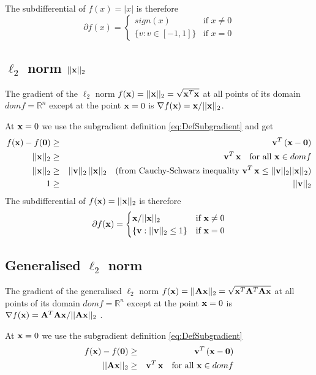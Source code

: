 The subdifferential of $f(x) = |x|$ is therefore
\begin{equation}
\partial f(x) =   
\begin{cases} 
   sign(x) & \text{if } x \neq 0 \\
   \{v: v \in [-1,1]\} & \text{if } x = 0
  \end{cases}
\end{equation}

\subsection{$\ell_2$ norm $||\mathbf{x}||_2$}
The gradient of the $\ell_2$ norm $f(\mathbf{x}) = ||\mathbf{x}||_2 = \sqrt{\mathbf{x}^T \mathbf{x}}$ at all points of its domain $dom f = \mathbb{R}^n$ except at the point $\mathbf{x}=0$ is $\nabla f(\mathbf{x}) = \mathbf{x}/||\mathbf{x}||_2$.

At $\mathbf{x}=0$ we use the subgradient definition \eqref{eq:DefSubgradient} and get
\begin{eqnarray}\label{eq:SG_L2}
f(\mathbf{x}) - f(\mathbf{0}) & \geq & \mathbf{v}^T \, (\mathbf{x} - \mathbf{0}) \nonumber \\ 
||\mathbf{x}||_2 & \geq & \mathbf{v}^T \, \mathbf{x}  \quad \text{for all } \mathbf{x} \in dom f \nonumber \\
||\mathbf{x}||_2 & \geq & ||\mathbf{v}||_2 \, ||\mathbf{x}||_2  \quad (\text{from Cauchy-Schwarz inequality } \mathbf{v}^T \, \mathbf{x} \leq ||\mathbf{v}||_2 ||\mathbf{x}||_2) \nonumber \\
1 & \geq & ||\mathbf{v}||_2
\end{eqnarray}
The subdifferential of $f(\mathbf{x}) = ||\mathbf{x}||_2$ is therefore
\begin{equation}
\partial f(\mathbf{x}) =   
\begin{cases} 
   \mathbf{x}/||\mathbf{x}||_2 & \text{if } \mathbf{x} \neq 0 \\
   \{\mathbf{v}: ||\mathbf{v}||_2 \leq 1\} & \text{if } \mathbf{x} = 0
  \end{cases}
\end{equation}


\subsection{Generalised $\ell_2$ norm}
The gradient of the generalised $\ell_2$ norm $f(\mathbf{x}) = ||\mathbf{Ax}||_2 = \sqrt{\mathbf{x}^T \mathbf{A}^T \mathbf{A} \mathbf{x}}$ at all points of its domain $dom f = \mathbb{R}^n$ except at the point $\mathbf{x}=0$ is $\nabla f(\mathbf{x}) = \mathbf{A}^T \mathbf{A} \mathbf{x}/||\mathbf{A} \mathbf{x}||_2$ .

At $\mathbf{x}=0$ we use the subgradient definition \eqref{eq:DefSubgradient} 
\begin{eqnarray}\label{eq:SG_GL2}
f(\mathbf{x}) - f(\mathbf{0}) & \geq & \mathbf{v}^T \, (\mathbf{x} - \mathbf{0}) \nonumber \\ 
||\mathbf{A}\mathbf{x}||_2 & \geq & \mathbf{v}^T \, \mathbf{x}  \quad \text{for all } \mathbf{x} \in dom f 
\end{eqnarray}

